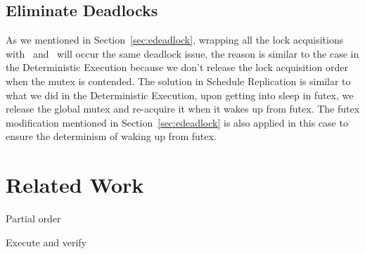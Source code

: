 \subsection{Eliminate Deadlocks} \label{sec:rdeadlock}
As we mentioned in Section~\ref{sec:edeadlock}, wrapping all the lock acquisitions with \detstart\ and \detend\ will occur the same deadlock issue, the reason is similar to the case in the Deterministic Execution because we don't release the lock acquisition order when the mutex is contended. The solution in Schedule Replication is similar to what we did in the Deterministic Execution, upon getting into sleep in futex, we release the global mutex and re-acquire it when it wakes up from futex. The futex modification mentioned in Section~\ref{sec:edeadlock} is also applied in this case to ensure the determinism of waking up from futex.

\section{Related Work}


Partial order

Execute and verify
